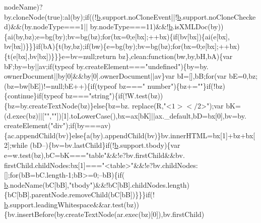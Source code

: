 \begin{DoxyCode}
      nodeName)?by.cloneNode(\textcolor{keyword}{true}):al(by);\textcolor{keywordflow}{if}((!\hyperlink{jquery_8js_aa4026ad5544b958e54ce5e106fa1c805}{b}.support.noCloneEvent||!\hyperlink{jquery_8js_aa4026ad5544b958e54ce5e106fa1c805}{b}.support.noCloneChecked)&&(by.nodeType===1||
      by.nodeType===11)&&!\hyperlink{jquery_8js_aa4026ad5544b958e54ce5e106fa1c805}{b}.isXMLDoc(by))\{ai(by,bz);e=bg(by);bv=bg(bz);\textcolor{keywordflow}{for}(bx=0;e[bx];++bx)\{\textcolor{keywordflow}{if}(bv[bx])\{ai(e[bx],
      bv[bx])\}\}\}\textcolor{keywordflow}{if}(bA)\{t(by,bz);\textcolor{keywordflow}{if}(bw)\{e=bg(by);bv=bg(bz);\textcolor{keywordflow}{for}(bx=0;e[bx];++bx)\{t(e[bx],bv[bx])\}\}\}e=bv=null;\textcolor{keywordflow}{return} 
      bz\},clean:\textcolor{keyword}{function}(bw,by,bH,bA)\{var bF;by=by||av;\textcolor{keywordflow}{if}(typeof by.createElement===\textcolor{stringliteral}{"undefined"})\{by=by.
      ownerDocument||by[0]&&by[0].ownerDocument||av\}var bI=[],bB;\textcolor{keywordflow}{for}(var bE=0,bz;(bz=bw[bE])!=null;bE++)\{\textcolor{keywordflow}{if}(typeof bz===\textcolor{stringliteral}{"
      number"})\{bz+=\textcolor{stringliteral}{""}\}\textcolor{keywordflow}{if}(!bz)\{\textcolor{keywordflow}{continue}\}\textcolor{keywordflow}{if}(typeof bz===\textcolor{stringliteral}{"string"})\{\textcolor{keywordflow}{if}(!W.test(bz))\{bz=by.createTextNode(bz)\}\textcolor{keywordflow}{else}\{bz=bz.
      replace(R,\textcolor{stringliteral}{"<$1></$2>"});var bK=(d.exec(bz)||[\textcolor{stringliteral}{""},\textcolor{stringliteral}{""}])[1].toLowerCase(),bx=ax[bK]||ax.\_default,bD=bx[0],bv=by.
      createElement(\textcolor{stringliteral}{"div"});\textcolor{keywordflow}{if}(by===av)\{ac.appendChild(bv)\}\textcolor{keywordflow}{else}\{a(by).appendChild(bv)\}bv.innerHTML=bx[1]+bz+bx[2];\textcolor{keywordflow}{while}
      (bD--)\{bv=bv.lastChild\}\textcolor{keywordflow}{if}(!\hyperlink{jquery_8js_aa4026ad5544b958e54ce5e106fa1c805}{b}.support.tbody)\{var e=w.test(bz),bC=bK===\textcolor{stringliteral}{"table"}&&!e?bv.firstChild&&bv.
      firstChild.childNodes:bx[1]===\textcolor{stringliteral}{"<table>"}&&!e?bv.childNodes:[];\textcolor{keywordflow}{for}(bB=bC.length-1;bB>=0;--bB)\{\textcolor{keywordflow}{if}(
      \hyperlink{jquery_8js_aa4026ad5544b958e54ce5e106fa1c805}{b}.nodeName(bC[bB],\textcolor{stringliteral}{"tbody"})&&!bC[bB].childNodes.length)\{bC[bB].parentNode.removeChild(bC[bB])\}\}\}\textcolor{keywordflow}{if}(!
      \hyperlink{jquery_8js_aa4026ad5544b958e54ce5e106fa1c805}{b}.support.leadingWhitespace&&ar.test(bz))\{bv.insertBefore(by.createTextNode(ar.exec(bz)[0]),bv.firstChild)

\end{DoxyCode}
